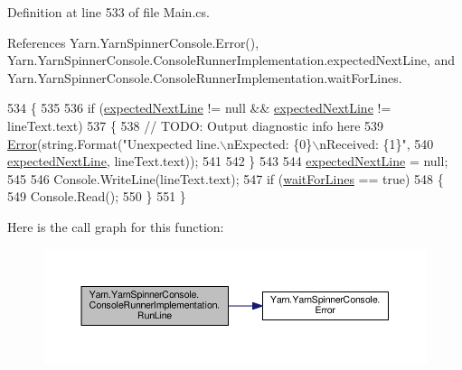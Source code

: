 Definition at line 533 of file Main.\-cs.



References Yarn.\-Yarn\-Spinner\-Console.\-Error(), Yarn.\-Yarn\-Spinner\-Console.\-Console\-Runner\-Implementation.\-expected\-Next\-Line, and Yarn.\-Yarn\-Spinner\-Console.\-Console\-Runner\-Implementation.\-wait\-For\-Lines.


\begin{DoxyCode}
534             \{
535 
536                 \textcolor{keywordflow}{if} (\hyperlink{a00050_a33a44e39f2d90850cee234dfad50f2c5}{expectedNextLine} != null && \hyperlink{a00050_a33a44e39f2d90850cee234dfad50f2c5}{expectedNextLine} != 
      lineText.text)
537                 \{
538                     \textcolor{comment}{// TODO: Output diagnostic info here}
539                     \hyperlink{a00189_a2f63f9f5b7634cb50ee75ff2eb18b137}{Error}(\textcolor{keywordtype}{string}.Format(\textcolor{stringliteral}{"Unexpected line.\(\backslash\)nExpected: \{0\}\(\backslash\)nReceived: \{1\}"},
540                         \hyperlink{a00050_a33a44e39f2d90850cee234dfad50f2c5}{expectedNextLine}, lineText.text));
541 
542                 \}
543 
544                 \hyperlink{a00050_a33a44e39f2d90850cee234dfad50f2c5}{expectedNextLine} = null;
545 
546                 Console.WriteLine(lineText.text);
547                 \textcolor{keywordflow}{if} (\hyperlink{a00050_a90b0c755ea1d2f3ffaffa6cf18266709}{waitForLines} == \textcolor{keyword}{true})
548                 \{
549                     Console.Read();
550                 \}
551             \}
\end{DoxyCode}


Here is the call graph for this function\-:
\nopagebreak
\begin{figure}[H]
\begin{center}
\leavevmode
\includegraphics[width=350pt]{a00050_a13bc6c3a8ba43223a20befae50dbbcb4_cgraph}
\end{center}
\end{figure}


